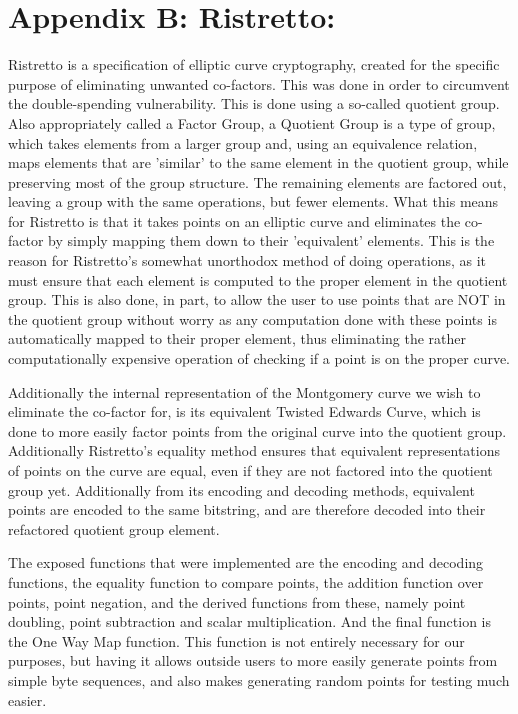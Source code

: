 \documentclass{article}
\begin{document}
\section{Appendix B: Ristretto:} \label{ristretto}
Ristretto is a specification of elliptic curve cryptography, created for
the specific purpose of eliminating unwanted co-factors. This was done
in order to circumvent the double-spending vulnerability. This is done
using a so-called quotient group. Also appropriately called a Factor
Group, a Quotient Group is a type of group, which takes elements from a
larger group and, using an equivalence relation, maps elements that are
'similar' to the same element in the quotient group, while preserving
most of the group structure. The remaining elements are factored out,
leaving a group with the same operations, but fewer elements. What
this means for Ristretto is that it takes points on an elliptic curve
and eliminates the co-factor by simply mapping them down to their
'equivalent' elements. This is the reason for Ristretto's somewhat
unorthodox method of doing operations, as it must ensure that each
element is computed to the proper element in the quotient group. This is
also done, in part, to allow the user to use points that are NOT in the
quotient group without worry as any computation done with these points
is automatically mapped to their proper element, thus eliminating the
rather computationally expensive operation of checking if a point is
on the proper curve.

Additionally the internal representation of the Montgomery curve we wish
to eliminate the co-factor for, is its equivalent Twisted Edwards Curve,
which is done to more easily factor points from the original curve into
the quotient group. Additionally Ristretto's equality method ensures
that equivalent representations of points on the curve are equal, even
if they are not factored into the quotient group yet. Additionally
from its encoding and decoding methods, equivalent points are encoded
to the same bitstring, and are therefore decoded into their refactored
quotient group element.

The exposed functions that were implemented are the encoding and decoding
functions, the equality function to compare points, the addition function
over points, point negation, and the derived functions from these,
namely point doubling, point subtraction and scalar multiplication. And
the final function is the One Way Map function. This function is not
entirely necessary for our purposes, but having it allows outside users
to more easily generate points from simple byte sequences, and 
also makes generating random points for testing much easier.
\end{document}
